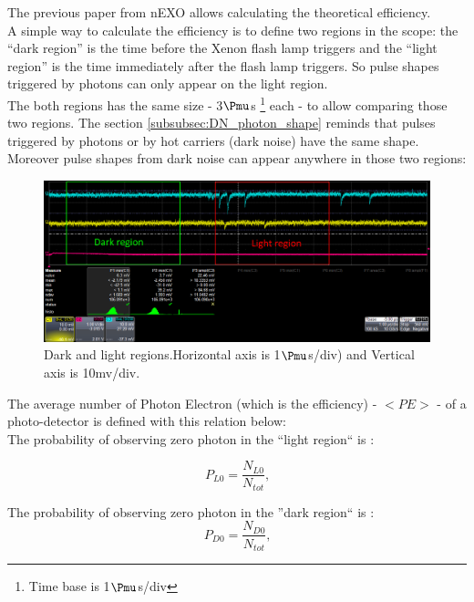 \documentclass[a4paper, 11pt]{report}%
\newcommand{\xfl}{Xenon flash lamp }
\begin{document}
  
  The previous paper from nEXO \cite{ref:charac_SiPM_nEXO} allows calculating the theoretical efficiency.\\
  A simple way to calculate the efficiency is to define two regions in the scope: the ``dark region'' is the time before the \xfl 
  triggers and the ``light region'' is the time immediately after the flash lamp triggers. So pulse shapes triggered by 
  photons can only appear on the light region.\\
  The both regions has the same size - 3$\Pmu$s \footnote{Time base is 1$\Pmu$s/div} each - to allow comparing those two regions. 
  The section \ref{subsubsec:DN_photon_shape} reminds that pulses triggered by photons or by hot carriers (dark noise) have the same shape. 
  Moreover pulse shapes from dark noise can appear anywhere in those two regions: 
  
  \begin{figure}[!hbtp]
    \centering
    \includegraphics[totalheight=0.2\textwidth,trim=0.3cm 6.6cm 0.1cm 0cm, clip=true]{../Pictures/blabla/light_region_3.png}
    \caption{Dark and light regions.Horizontal axis is 1$\Pmu$s/div) and Vertical axis is 10mv/div.}
    \label{fig:dark_light_region}
  \end{figure}
  
  
  The average number of Photon Electron (which is the efficiency) - \(<PE>\) - of a photo-detector is defined with this relation below: 
  \\
  
  The probability of observing zero photon in the ``light region`` is : 
  
  \begin{equation}
    P_{L0} = \frac{N_{L0}}{N_{tot}} \textrm{,}   
  \end{equation}
  
  The probability of observing zero photon in the ''dark region`` is : 
  \begin{equation}
    P_{D0} = \frac{N_{D0}}{N_{tot}} \textrm{,}
  \end{equation}
  
\end{document}
